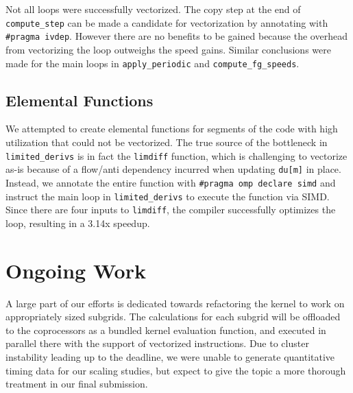 \documentclass{scrartcl}
\begin{document}
    Not all loops were successfully vectorized. The copy step at the end of \verb|compute_step| can be made a candidate for vectorization by annotating with \verb|#pragma ivdep|. However there are no benefits to be gained because the overhead from vectorizing the loop outweighs the speed gains. Similar conclusions were made for the main loops in \verb|apply_periodic| and \verb|compute_fg_speeds|.

  \subsection{Elemental Functions}
  We attempted to create elemental functions for segments of the code with high utilization that could not be vectorized. The true source of the bottleneck in \verb|limited_derivs| is in fact the \verb|limdiff| function, which is challenging to vectorize as-is because of a flow/anti dependency incurred when updating \verb|du[m]| in place. Instead, we annotate the entire function with \verb|#pragma omp declare simd| and instruct the main loop in \verb|limited_derivs| to execute the function via SIMD. Since there are four inputs to \verb|limdiff|, the compiler successfully optimizes the loop, resulting in a 3.14x speedup.

  \section{Ongoing Work}
  A large part of our efforts is dedicated towards refactoring the kernel to work on appropriately sized subgrids. The calculations for each subgrid will be offloaded to the coprocessors as a bundled kernel evaluation function, and executed in parallel there with the support of vectorized instructions. Due to cluster instability leading up to the deadline, we were unable to generate quantitative timing data for our scaling studies, but expect to give the topic a more thorough treatment in our final submission.
\end{document}
